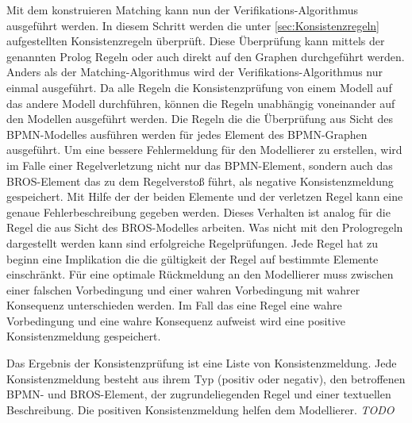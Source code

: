 Mit dem konstruieren Matching kann nun der Verifikations-Algorithmus ausgeführt werden.
In diesem Schritt werden die unter \cref{sec:Konsistenzregeln} aufgestellten Konsistenzregeln überprüft.
Diese Überprüfung kann mittels der genannten Prolog Regeln oder auch direkt auf den Graphen durchgeführt werden.
Anders als der Matching-Algorithmus wird der Verifikations-Algorithmus nur einmal ausgeführt.
Da alle Regeln die Konsistenzprüfung von einem Modell auf das andere Modell durchführen, können die Regeln unabhängig voneinander auf den Modellen ausgeführt werden.
Die Regeln die die Überprüfung aus Sicht des BPMN-Modelles ausführen werden für jedes Element des BPMN-Graphen ausgeführt.
Um eine bessere Fehlermeldung für den Modellierer zu erstellen, wird im Falle einer Regelverletzung nicht nur das BPMN-Element, sondern auch das BROS-Element das zu dem Regelverstoß führt, als negative Konsistenzmeldung gespeichert.
Mit Hilfe der der beiden Elemente und der verletzen Regel kann eine genaue Fehlerbeschreibung gegeben werden.
Dieses Verhalten ist analog für die Regel die aus Sicht des BROS-Modelles arbeiten.
Was nicht mit den Prologregeln dargestellt werden kann sind erfolgreiche Regelprüfungen.
Jede Regel hat zu beginn eine Implikation die die gültigkeit der Regel auf bestimmte Elemente einschränkt.
Für eine optimale Rückmeldung an den Modellierer muss zwischen einer falschen Vorbedingung und einer wahren Vorbedingung mit wahrer Konsequenz unterschieden werden.
Im Fall das eine Regel eine wahre Vorbedingung und eine wahre Konsequenz aufweist wird eine positive Konsistenzmeldung gespeichert.

Das Ergebnis der Konsistenzprüfung ist eine Liste von Konsistenzmeldung.
Jede Konsistenzmeldung besteht aus ihrem Typ (positiv oder negativ), den betroffenen BPMN- und BROS-Element, der zugrundeliegenden Regel und einer textuellen Beschreibung.
Die positiven Konsistenzmeldung helfen dem Modellierer. \textit{TODO}
